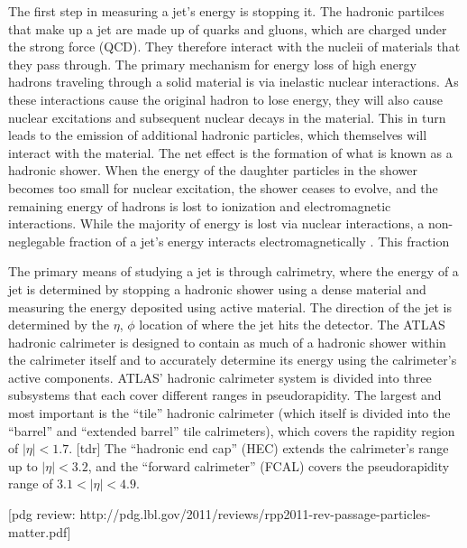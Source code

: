 The first step in measuring a jet's energy is stopping it.  
The hadronic partilces that make up a jet are made up of quarks and gluons, which are charged under the strong force (QCD).
They therefore interact with the nucleii of materials that they pass through.
The primary mechanism for energy loss of high energy hadrons traveling through a solid material is via inelastic nuclear interactions.
As these interactions cause the original hadron to lose energy, they will also cause nuclear excitations and subsequent nuclear decays in the material.
This in turn leads to the emission of additional hadronic particles, which themselves will interact with the material.
The net effect is the formation of what is known as a hadronic shower.
When the energy of the daughter particles in the shower becomes too small for nuclear excitation, the shower ceases to evolve, and the remaining energy of hadrons is lost to ionization and electromagnetic interactions.
While the majority of energy is lost via nuclear interactions, a non-neglegable fraction of a jet's energy interacts electromagnetically .
This fraction 

The primary means of studying a jet is through calrimetry, where the energy of a jet is determined by stopping a hadronic shower using a dense material and measuring the energy deposited using active material.
The direction of the jet is determined by the  $\eta$, $\phi$ location of where the jet hits the detector.
The ATLAS hadronic calrimeter is designed to contain as much of a hadronic shower within the calrimeter itself and to accurately determine its energy using the calrimeter's active components.
ATLAS' hadronic calrimeter system is divided into three subsystems that each cover different ranges in pseudorapidity.  
The largest and most important is the ``tile'' hadronic calrimeter (which itself is divided into the ``barrel'' and ``extended barrel'' tile calrimeters), which covers the rapidity region of $|\eta| < 1.7$. [tdr]  
The ``hadronic end cap'' (HEC) extends the calrimeter's range up to $|\eta| < 3.2$, and the ``forward calrimeter'' (FCAL) covers the pseudorapidity range of $3.1 < |\eta| < 4.9$.  


[pdg review: http://pdg.lbl.gov/2011/reviews/rpp2011-rev-passage-particles-matter.pdf]

